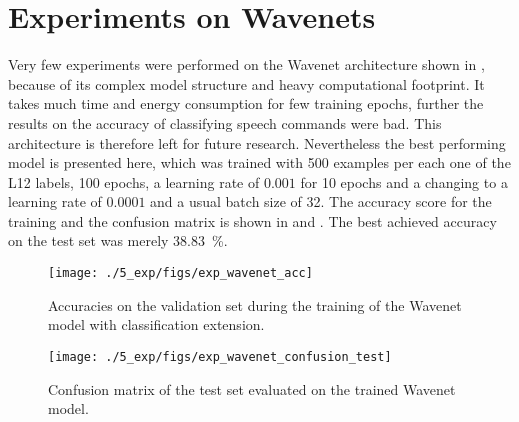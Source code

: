 
\section{Experiments on Wavenets}\label{exp_wavenet}
\thesisStateRevised
Very few experiments were performed on the Wavenet architecture shown in , because of its complex model structure and heavy computational footprint.
It takes much time and energy consumption for few training epochs, further the results on the accuracy of classifying speech commands were bad.
This architecture is therefore left for future research.
Nevertheless the best performing model is presented here, which was trained with 500 examples per each one of the L12 labels, 100 epochs, a learning rate of $0.001$ for 10 epochs and a changing to a learning rate of $0.0001$ and a usual batch size of 32.
The accuracy score for the training and the confusion matrix is shown in  and .
The best achieved accuracy on the test set was merely \SI{38.83}{\percent}.
\begin{figure}[!ht]
  \centering
  \texttt{[image: ./5\_exp/figs/exp\_wavenet\_acc]}
  \caption{Accuracies on the validation set during the training of the Wavenet model with classification extension.}
  \label{fig:exp_wavenet_acc}
\end{figure}
\begin{figure}[!ht]
  \centering
  \texttt{[image: ./5\_exp/figs/exp\_wavenet\_confusion\_test]}
  \caption{Confusion matrix of the test set evaluated on the trained Wavenet model.}
  \label{fig:exp_wavenet_confusion}
\end{figure}
\FloatBarrier
\noindent